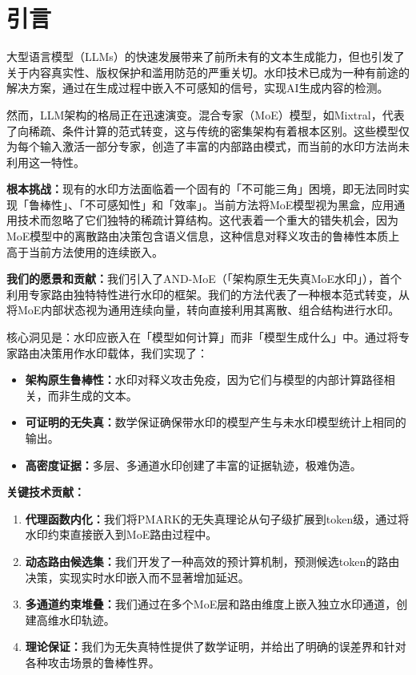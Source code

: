 \documentclass[letterpaper,twocolumn,10pt]{article}
\begin{document}
\section{引言}

大型语言模型（LLMs）的快速发展带来了前所未有的文本生成能力，但也引发了关于内容真实性、版权保护和滥用防范的严重关切\cite{christ2023watermarking}。水印技术已成为一种有前途的解决方案，通过在生成过程中嵌入不可感知的信号，实现AI生成内容的检测\cite{kirchenbauer2023watermark}。

然而，LLM架构的格局正在迅速演变。混合专家（MoE）模型，如Mixtral\cite{jiang2024mixtral}，代表了向稀疏、条件计算的范式转变，这与传统的密集架构有着根本区别\cite{fedus2021switch}。这些模型仅为每个输入激活一部分专家，创造了丰富的内部路由模式，而当前的水印方法尚未利用这一特性。

\textbf{根本挑战：}现有的水印方法面临着一个固有的「不可能三角」困境，即无法同时实现「鲁棒性」、「不可感知性」和「效率」\cite{li2023survey}。当前方法将MoE模型视为黑盒，应用通用技术而忽略了它们独特的稀疏计算结构。这代表着一个重大的错失机会，因为MoE模型中的离散路由决策包含语义信息，这种信息对释义攻击的鲁棒性本质上高于当前方法使用的连续嵌入。

\textbf{我们的愿景和贡献：}我们引入了AND-MoE（「架构原生无失真MoE水印」），首个利用专家路由独特特性进行水印的框架。我们的方法代表了一种根本范式转变，从将MoE内部状态视为通用连续向量，转向直接利用其离散、组合结构进行水印。

核心洞见是：水印应嵌入在「模型如何计算」而非「模型生成什么」中。通过将专家路由决策用作水印载体，我们实现了：

\begin{itemize}
\item \textbf{架构原生鲁棒性：}水印对释义攻击免疫，因为它们与模型的内部计算路径相关，而非生成的文本。
\item \textbf{可证明的无失真：}数学保证确保带水印的模型产生与未水印模型统计上相同的输出。
\item \textbf{高密度证据：}多层、多通道水印创建了丰富的证据轨迹，极难伪造。
\end{itemize}

\textbf{关键技术贡献：}

\begin{enumerate}
\item \textbf{代理函数内化：}我们将PMARK的无失真理论\cite{pmark2024}从句子级扩展到token级，通过将水印约束直接嵌入到MoE路由过程中。

\item \textbf{动态路由候选集：}我们开发了一种高效的预计算机制，预测候选token的路由决策，实现实时水印嵌入而不显著增加延迟。

\item \textbf{多通道约束堆叠：}我们通过在多个MoE层和路由维度上嵌入独立水印通道，创建高维水印轨迹。

\item \textbf{理论保证：}我们为无失真特性提供了数学证明，并给出了明确的误差界和针对各种攻击场景的鲁棒性界。
\end{enumerate}
\end{document}
